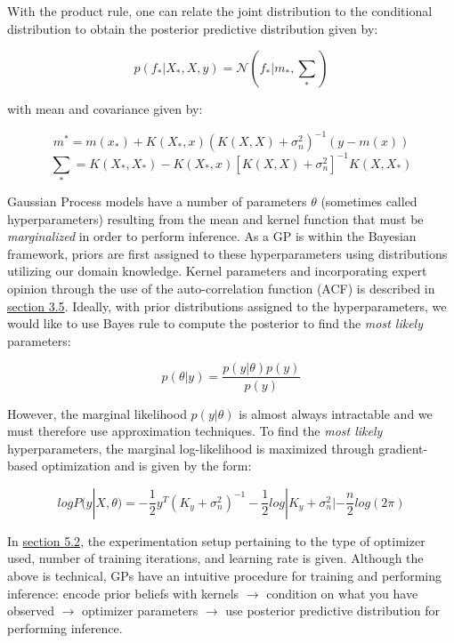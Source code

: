 With the product rule, one can relate the joint distribution to the conditional distribution to obtain the posterior predictive distribution given by:

\begin{equation}
p(f_* | X_*, X, y) = \mathcal{N}(f_* | m_*, \sum_*)
\end{equation}

with mean and covariance given by:

\begin{equation}
m^* = m(x_*) + K(X_*, x)(K(X, X) + \sigma_{n}^2)^{-1}(y - m(x))
\end{equation}
\begin{equation}
\sum_{*} = K(X_*, X_*) - K(X_*, x)[K(X, X) + \sigma_{n}^2]^{-1}K(X, X_*)
\end{equation}

Gaussian Process models have a number of parameters $\theta$ (sometimes called hyperparameters) resulting from the mean and kernel function that must be \textit{marginalized} in order to perform inference. As a GP is within the Bayesian framework, priors are first assigned to these hyperparameters using distributions utilizing our domain knowledge. Kernel parameters and incorporating expert opinion through the use of the auto-correlation function (ACF) is described in \hyperlink{subsection.3.5}{section 3.5}. Ideally, with prior distributions assigned to the hyperparameters, we would like to use Bayes rule to compute the posterior to find the \textit{most likely} parameters:

\begin{equation}
p(\theta | y) = \frac{p(y | \theta)p(y)}{p(y)}
\end{equation}

However, the marginal likelihood $p(y | \theta)$ is almost always intractable and we must therefore use approximation techniques. To find the \textit{most likely} hyperparameters, the marginal log-likelihood is maximized through gradient-based optimization and is given by the form:

\begin{equation}
log P(y | X, \theta) = -\frac{1}{2}y^T(K_{y} + \sigma_{n}^2)^{-1} - \frac{1}{2}log|K_{y} + \sigma_{n}^2| - \frac{n}{2} log(2\pi)
\end{equation}

In \hyperlink{section.5.2}{section 5.2}, the experimentation setup pertaining to the type of optimizer used, number of training iterations, and learning rate is given. Although the above is technical, GPs have an intuitive procedure for training and performing inference: encode prior beliefs with kernels $\rightarrow$ condition on what you have observed $\rightarrow$ optimizer parameters $\rightarrow$ use posterior predictive distribution for performing inference.

